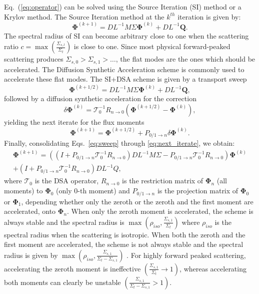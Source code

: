 \documentclass[preprint,10pt]{elsarticle}
\newcommand\bs{\boldsymbol}
\renewcommand{\(}{\left(}
\renewcommand{\)}{\right)}
\renewcommand{\[}{\left[}
\renewcommand{\]}{\right]}
\newcommand{\eqt}[1]{Eq.~(\ref{#1})}                     %
\begin{document}
\eqt{eq:operator} can be solved using the Source Iteration (SI) method or a
Krylov method. The Source Iteration method at the $k^{th}$ iteration is given
by:
%
\begin{equation}
\bs{\Phi}^{(k+1)} = DL^{-1}M\Sigma \bs{\Phi}^{(k)} + DL^{-1}\bs{Q} .
\end{equation}
%
The spectral radius of SI can become arbitrary close to one when the
scattering ratio $c=\max\(\frac{\Sigma_{s,l}}{\Sigma_t}\)$ is close to one.
Since most physical forward-peaked scattering produces
$\Sigma_{s,0}>\Sigma_{s,1}>\hdots$, the flat modes are the ones which should
be accelerated. The Diffusion Synthetic Acceleration scheme \cite{adams} is
commonly used to accelerate these flat modes. The SI+DSA scheme is given by
%
a transport sweep
\begin{equation}
\label{eq:sweep}
\bs{\Phi}^{(k+1/2)} = DL^{-1}M\Sigma\bs{\Phi}^{(k)} + DL^{-1}\bs{Q},
\end{equation}
%
followed by a diffusion synthetic acceleration for the correction
%
\begin{equation}
\label{eq:corr}
\delta\bs{\Phi}^{(k)} = \mathcal{T}_0^{-1} R_{n\rightarrow 0} 
\(\bs{\Phi}^{(k+1/2)}-\bs{\Phi}^{(k)}\) ,
\end{equation}
%
yielding the next iterate for the flux moments
%
\begin{equation}
\label{eq:next_iterate}
\bs{\Phi}^{(k+1)} = \bs{\Phi}^{(k+1/2)} + P_{0/1 \rightarrow n} \delta 
\bs{\Phi}^{(k)} .
\end{equation}
%
Finally, consolidating Eqs.~\eqref{eq:sweep} through \eqref{eq:next_iterate}, we obtain:
%
\begin{multline}
\bs{\Phi}^{(k+1)} = \((I+P_{0/1\rightarrow n} \mathcal{T}_0^{-1} R_{n\rightarrow 0} )
DL^{-1}M\Sigma-P_{0/1\rightarrow n}\mathcal{T}_0^{-1} R_{n\rightarrow 0}\)
\bs{\Phi}^{(k)}\\ + (I+P_{0/1\rightarrow n}\mathcal{T}_0^{-1}
R_{n\rightarrow 0})DL^{-1} Q ,
\end{multline}
%
where $\mathcal{T}_0$ is the DSA operator, $R_{n\rightarrow 0}$ is the
restriction matrix of $\bs{\Phi}_{n}$ (all moments) to $\bs{\Phi}_0$ (only 0-th moment) and $P_{0/1 \rightarrow
n}$ is the projection matrix of $\bs{\Phi}_0$ or $\bs{\Phi}_1$, depending
whether only the zeroth or the zeroth and the first moment are accelerated, onto
$\bs{\Phi}_n$. When only the zeroth moment is accelerated, the scheme is always
stable and the spectral radius is
$\max\(\rho_{iso},\frac{\Sigma_{s,1}}{\Sigma_t}\)$ where $\rho_{iso}$ is the
spectral radius when the scattering is isotropic. 
When both the zeroth and the
first moment are accelerated, the scheme is not always stable and the spectral
radius is given by
$\max\(\rho_{iso},\frac{\Sigma_{s,1}}{\Sigma_t-\Sigma_{s,1}}\)$
\cite{multisweep}. For highly forward peaked scattering, accelerating the zeroth moment 
is ineffective $\left(\tfrac{\Sigma_{s,1}}{\Sigma_t} \rightarrow 1 \right)$, 
whereas accelerating both moments can clearly be unstable $\left(
\frac{\Sigma_{s,1}}{\Sigma_t-\Sigma_{s,1}}>1 \right)$.
\end{document}
